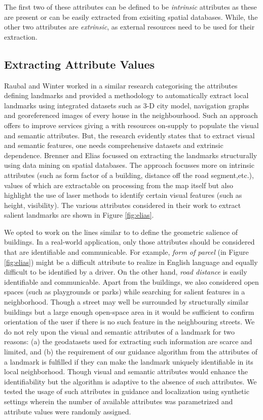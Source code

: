 \documentclass{iitkthesis}
\begin{document}
The first two of these attributes can be defined to be \textit{intrinsic} attributes as these are present or can be easily extracted from exisiting spatial databases. While, the other two attributes are \textit{extrinsic}, as external resources need to be used for their extraction.
\subsection{Extracting Attribute Values}
Raubal and Winter \cite{raubal} worked in a similar research categorising the attributes defining landmarks and provided a methodology to automatically extract local landmarks using integrated datasets such as 3-D city model, navigation graphs and georeferenced images of every house in the neighbourhood. Such an approach offers to improve services giving a with resources on-supply to populate the visual and semantic attributes. But, the research evidently states that to extract visual and semantic features, one needs comprehensive datasets and extrinsic dependence. Brenner and Elias \cite{brenner} focussed on extracting the landmarks structurally using data mining on spatial databases. The approach focusses more on intrinsic attributes (such as form factor of a building, distance off the road segment,etc.), values of which are extractable on processing from the map itself but also highlight the use of laser methods to identify certain visual features (such as height, visibility). The various attributes considered in their work to extract salient landmarks are shown in Figure \ref{fig:elias}.

We opted to work on the lines similar to \cite{brenner} to define the geometric salience of buildings. In a real-world application, only those attributes should be considered that are identifiable and communicable. For example, \textit{form of parcel} (in Figure \ref{fig:elias}) might be a difficult attribute to realize in English language and equally difficult to be identified by a driver. On the other hand, \textit{road distance} is easily identifiable and communicable. Apart from the buildings, we also considered open spaces (such as playgrounds or parks) while searching for salient features in a neighborhood. Though a street may well be surrounded by structurally similar buildings but a large enough open-space area in it would be sufficient to confirm orientation of the user if there is no such feature in the neighbouring streets. We do not rely upon the visual and semantic attributes of a landmark for two reasons: (a) the geodatasets used for extracting such information are scarce and limited, and (b) the requirement of our guidance algorithm from the attributes of a landmark is fulfilled if they can make the landmark uniquely identifiable in its local neighborhood. Though visual and semantic attributes would enhance the identifiability but the algorithm is adaptive to the absence of such attributes. We tested the usage of such attributes in guidance and localization using synthetic settings wherein the number of available attributes was parametrized and attribute values were randomly assigned.
\end{document}
